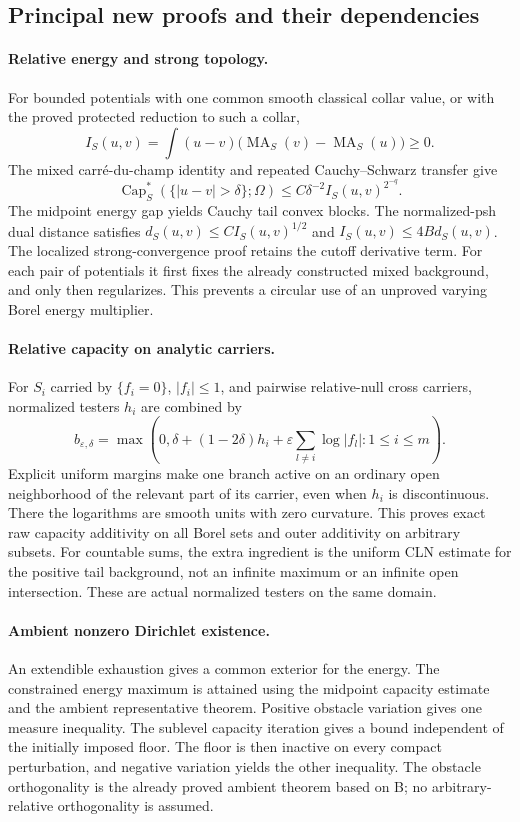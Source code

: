 \documentclass[11pt,a4paper]{article}
\numberwithin{equation}{section}
\theoremstyle{definition}
\theoremstyle{remark}
\begin{document}
\subsection{Principal new proofs and their dependencies}

\paragraph{Relative energy and strong topology.}
For bounded potentials with one common smooth classical collar value,
or with the proved protected reduction to such a collar,
\[
 I_S(u,v)=\int (u-v)
          \bigl(\operatorname{MA}_S(v)-\operatorname{MA}_S(u)\bigr)
       \geq0.
\]
The mixed carré-du-champ identity and repeated Cauchy--Schwarz
transfer give
\[
 \operatorname{Cap}_S^*(\{|u-v|>\delta\};\Omega)
       \leq C\delta^{-2} I_S(u,v)^{2^{-q}}.
\]
The midpoint energy gap yields Cauchy tail convex blocks. The
normalized-psh dual distance satisfies
$d_S(u,v)\leq C I_S(u,v)^{1/2}$ and $I_S(u,v)\leq4B d_S(u,v)$.
The localized strong-convergence proof retains the cutoff derivative
term. For each pair of potentials it first fixes the already
constructed mixed background, and only then regularizes. This
prevents a circular use of an unproved varying Borel energy multiplier.

\paragraph{Relative capacity on analytic carriers.}
For $S_i$ carried by $\{f_i=0\}$, $|f_i|\leq1$, and pairwise
relative-null cross carriers, normalized testers $h_i$ are combined by
\[
 b_{\varepsilon,\delta}
  =\max\left(0,
       \delta+(1-2\delta)h_i+\varepsilon
                        \sum_{l\ne i}\log|f_l|:1\leq i\leq m\right).
\]
Explicit uniform margins make one branch active on an ordinary open
neighborhood of the relevant part of its carrier, even when $h_i$
is discontinuous. There the logarithms are smooth units with zero
curvature. This proves exact raw capacity additivity on all Borel
sets and outer additivity on arbitrary subsets. For countable sums,
the extra ingredient is the uniform CLN estimate for the positive
tail background, not an infinite maximum or an infinite open
intersection. These are actual normalized testers on the same domain.

\paragraph{Ambient nonzero Dirichlet existence.}
An extendible exhaustion gives a common exterior for the energy.
The constrained energy maximum is attained using the midpoint
capacity estimate and the ambient representative theorem. Positive
obstacle variation gives one measure inequality. The sublevel
capacity iteration gives a bound independent of the initially imposed
floor. The floor is then inactive on every compact perturbation,
and negative variation yields the other inequality. The obstacle
orthogonality is the already proved ambient theorem based on B;
no arbitrary-relative orthogonality is assumed.
\end{document}
